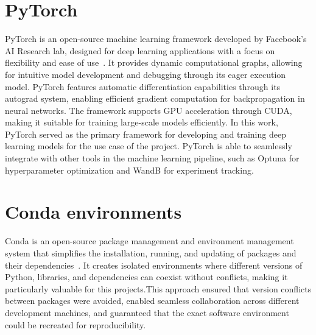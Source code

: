 \section{PyTorch}
PyTorch is an open-source machine learning framework developed by Facebook's AI Research lab, designed for deep learning applications with a 
focus on flexibility and ease of use~\cite{ansel_pytorch_2024}. It provides dynamic computational graphs, 
allowing for intuitive model development and debugging through its eager execution model. PyTorch features 
automatic differentiation capabilities through its autograd system, enabling efficient gradient computation 
for backpropagation in neural networks. The framework supports GPU acceleration through CUDA, making it suitable
for training large-scale models efficiently. In this work, PyTorch served as the primary framework for
developing and training deep learning models for the use case of the project. PyTorch is able to seamlessly integrate
with other tools in the machine learning pipeline, such as Optuna for hyperparameter optimization and
WandB for experiment tracking.

\section{Conda environments}
Conda is an open-source package management and environment management system that simplifies the installation, running, and updating of packages and 
their dependencies~\cite{conda_contributors_conda_2025}. It creates isolated environments where different versions of Python, libraries, 
and dependencies can coexist without conflicts, making it particularly valuable for this projects.This approach ensured that version conflicts between packages were avoided, enabled seamless collaboration across different 
development machines, and guaranteed that the exact software environment could be recreated for reproducibility.

